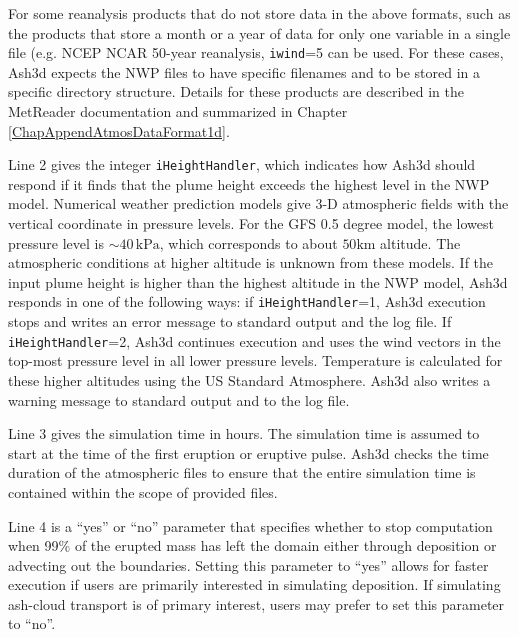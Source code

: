 For some reanalysis products that do not store data in the above formats, such as
the products that store a month or a year of data for only one variable in a single
file (e.g. NCEP NCAR 50-year reanalysis, \texttt{iwind}=5 can be used. For these cases,
Ash3d expects the NWP files to have specific filenames and to be stored in a
specific directory structure. Details for these products are described in the MetReader
documentation and summarized in Chapter \ref{ChapAppendAtmosDataFormat1d}.

Line 2 gives the integer \texttt{iHeightHandler}, which indicates how Ash3d should respond
if it finds that the plume height exceeds the highest level in the NWP model.
Numerical weather prediction models give 3-D atmospheric fields with the vertical coordinate
in pressure levels. For the GFS 0.5 degree model, the lowest pressure level is
$\sim 40 \,\mathrm{kPa}$,
which corresponds to about $50 \mathrm{km}$ altitude.
The atmospheric conditions at higher altitude is
unknown from these models. If the input plume height is higher than the highest
altitude in the NWP model, Ash3d responds in one of the following ways: if
\texttt{iHeightHandler}=1, Ash3d execution stops and writes an error message to standard output
and the log file.
If \texttt{iHeightHandler}=2, Ash3d continues execution and uses the wind vectors in the
top-most pressure level in all lower pressure levels. Temperature is calculated for these
higher altitudes using the US Standard Atmosphere. Ash3d also writes a warning
message to standard output and to the log file.

Line 3 gives the simulation time in hours. The simulation time is assumed to start
at the time of the first eruption or eruptive pulse. Ash3d checks the time duration
of the atmospheric files to ensure that the entire simulation time is contained within
the scope of provided files.

Line 4 is a ``yes'' or ``no'' parameter that specifies whether to stop computation
when 99\% of the erupted mass has left the domain either through deposition or
advecting out the boundaries. Setting this parameter to ``yes''
allows for faster execution if users are primarily interested in simulating
deposition. If simulating ash-cloud transport is of primary interest, users may
prefer to set this parameter to ``no''.

